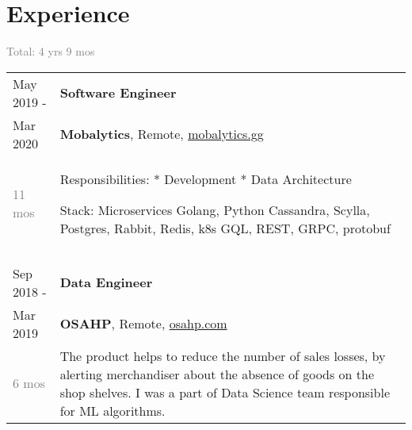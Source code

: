 \documentclass[a4paper,10pt]{article}
\begin{document}
\section{Experience}
\textcolor{gray}{Total: 4 yrs 9 mos}
\begin{tabularx}{\textwidth}{lX}
    May 2019 -              &   \textbf{Software Engineer} \\
    Mar 2020                &   \textbf{Mobalytics}, Remote,
                                \href{mobalytics.gg}{mobalytics.gg} \\
    \textcolor{gray}
    {11 mos}
                            &   \footnotesize{

                                    Responsibilities:\newline
                                    * Development\newline
                                    * Data Architecture\newline

                                    Stack:\newline
                                    Microservices\newline
                                    Golang, Python\newline
                                    Cassandra, Scylla, Postgres, Rabbit, Redis, k8s\newline
                                    GQL, REST, GRPC, protobuf
                                } \\

\multicolumn{2}{c}{}\\\\

    Sep 2018 -              &   \textbf{Data Engineer} \\
    Mar 2019                &   \textbf{OSAHP}, Remote,
                                \href{osahp.com}{osahp.com} \\
    \textcolor{gray}
    {6 mos}
                            &   \footnotesize{

                                    The product helps to reduce the number of sales losses, by alerting merchandiser about the absence of goods on the shop shelves.\newline
                                    I was a part of Data Science team responsible for ML algorithms.\newline

}
\end{tabularx}
\end{document}
